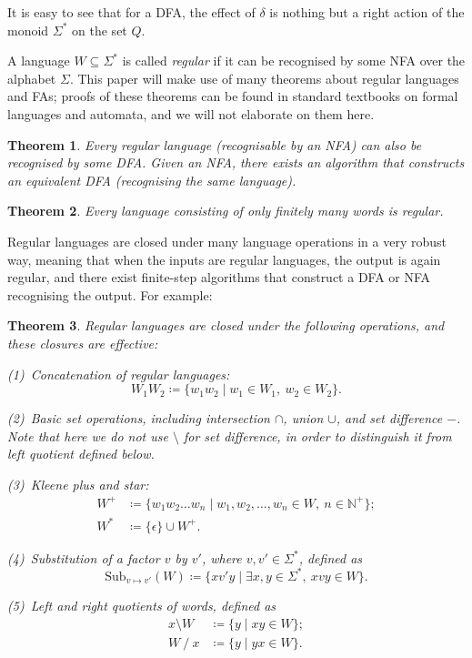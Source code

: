 \documentclass[11pt]{article}
\newtheorem{theorem}{Theorem}[section]
\theoremstyle{definition}
\theoremstyle{plain}
\begin{document}
It is easy to see that for a DFA, the effect of $\delta$ is nothing but a right action of the monoid $\varSigma^*$ on the set $Q$.

A language $W\subseteq\varSigma^*$ is called \textit{regular} if it can be recognised by some NFA over the alphabet $\varSigma$.
This paper will make use of many theorems about regular languages and FAs; proofs of these theorems can be found in standard textbooks on formal languages and automata, and we will not elaborate on them here.

\begin{theorem}\label{reg_determ}
    Every regular language (recognisable by an NFA) can also be recognised by some DFA. Given an NFA, there exists an algorithm that constructs an equivalent DFA (recognising the same language).
\end{theorem}

\begin{theorem}\label{reg_finite}
    Every language consisting of only finitely many words is regular.
\end{theorem}

Regular languages are closed under many language operations in a very robust way, meaning that when the inputs are regular languages, the output is again regular, and there exist finite-step algorithms that construct a DFA or NFA recognising the output. For example:

\begin{theorem}\label{reg_closure}
    Regular languages are closed under the following operations, and these closures are effective:

    (1)~Concatenation of regular languages:
    \[
        W_1 W_2 \coloneq \{w_1 w_2 \mid w_1 \in W_1,\ w_2\in W_2\}.
    \]

    (2)~Basic set operations, including intersection $\cap$, union $\cup$, and set difference $-$.
Note that here we do not use $\setminus$ for set difference, in order to distinguish it from left quotient defined below.

    (3)~Kleene plus and star:
    \begin{align*}
        W^+ & \coloneq \{w_1 w_2\ldots w_n \mid w_1, w_2, \ldots, w_n\in W,\ n\in\mathbb{N}^+\}; \\
        W^* & \coloneq \{\epsilon\} \cup W^+.
    \end{align*}

    (4)~Substitution of a factor $v$ by $v'$, where $v,v'\in\varSigma^*$, defined as
    \[
        \mathrm{Sub}_{v\mapsto v'}(W) \coloneq \{x v' y \mid \exists x,y\in\varSigma^*,\ x v y\in W\}.
    \]

    (5)~Left and right quotients of words, defined as
    \begin{align*}
        x \setminus W & \coloneq \{y \mid xy\in W\}; \\
        W ~/~ x     & \coloneq \{y \mid yx\in W\}.
    \end{align*}
\end{theorem}
\end{document}

